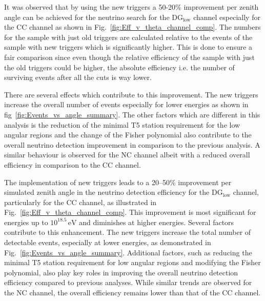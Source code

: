 It was observed that by using the new triggers a 50-20\% improvement per zenith angle can be achieved for the neutrino search for the DG$\mathrm{_{low}}$ channel especially for the CC channel as shown in Fig.~\ref{fig:Eff_v_theta_channel_comp}. The numbers for the sample with just old triggers are calculated relative to the events of the sample with new triggers which is significantly higher. This is done to ensure a fair comparison since even though the relative efficiency of the sample with just the old triggers could be higher, the absolute efficiency i.e. the number of surviving events after all the cuts is way lower. 

There are several effects which contribute to this improvement. The new triggers increase the overall number of events especially for lower energies as shown in fig~\ref{fig:Events_vs_angle_summary}. The other factors which are different in this analysis is the reduction of the minimal T5 station requirement for the low angular regions and the change of the Fisher polynomial also contribute to the overall neutrino detection improvement in comparison to the previous analysis. A similar behaviour is observed for the NC channel albeit with a reduced overall efficiency in comparison to the CC channel. 

The implementation of new triggers leads to a 20--50\% improvement per simulated zenith angle in the neutrino detection efficiency for the DG$_{\mathrm{low}}$ channel, particularly for the CC channel, as illustrated in Fig.~\ref{fig:Eff_v_theta_channel_comp}. This improvement is most significant for energies up to \(10^{18.5}\,\mathrm{eV}\) and diminishes at higher energies. Several factors contribute to this enhancement. The new triggers increase the total number of detectable events, especially at lower energies, as demonstrated in Fig.~\ref{fig:Events_vs_angle_summary}. Additional factors, such as reducing the minimal T5 station requirement for low angular regions and modifying the Fisher polynomial, also play key roles in improving the overall neutrino detection efficiency compared to previous analyses. While similar trends are observed for the NC channel, the overall efficiency remains lower than that of the CC channel.









